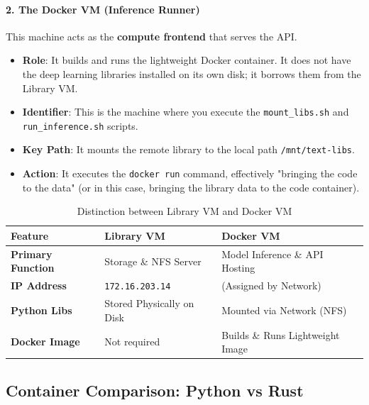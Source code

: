 \documentclass{ieeeaccess}
\begin{document}
\paragraph{2. The Docker VM (Inference Runner)}
This machine acts as the \textbf{compute frontend} that serves the API.
\begin{itemize}
    \item \textbf{Role}: It builds and runs the lightweight Docker container. It does not have the deep learning libraries installed on its own disk; it borrows them from the Library VM.
    \item \textbf{Identifier}: This is the machine where you execute the \texttt{mount\_libs.sh} and \texttt{run\_inference.sh} scripts.
    \item \textbf{Key Path}: It mounts the remote library to the local path \texttt{/mnt/text-libs}.
    \item \textbf{Action}: It executes the \texttt{docker run} command, effectively "bringing the code to the data" (or in this case, bringing the library data to the code container).
\end{itemize}

\begin{table}[t!]
\centering
\begin{tabular}{|l|l|l|}
\hline
\textbf{Feature} & \textbf{Library VM} & \textbf{Docker VM} \\ \hline
\textbf{Primary Function} & Storage \& NFS Server & Model Inference \& API Hosting \\ \hline
\textbf{IP Address} & \texttt{172.16.203.14} & (Assigned by Network) \\ \hline
\textbf{Python Libs} & Stored Physically on Disk & Mounted via Network (NFS) \\ \hline
\textbf{Docker Image} & Not required & Builds \& Runs Lightweight Image \\ \hline
\end{tabular}
\caption{Distinction between Library VM and Docker VM}
\end{table}




\newpage

\subsection{Container Comparison: Python vs Rust}
\end{document}
